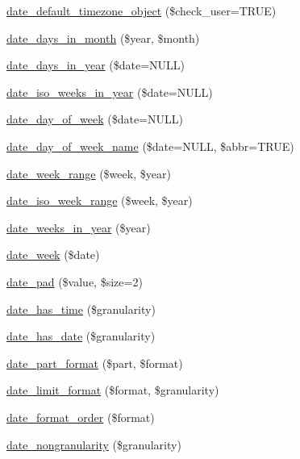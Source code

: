 \begin{DoxyCompactItemize}
\item 
\hyperlink{date__api_8module_ab642766b1f0a98ed0c91e765e8e2085b}{date\_\-default\_\-timezone\_\-object} (\$check\_\-user=TRUE)
\item 
\hyperlink{date__api_8module_ab98127065d91ca887cbae1675622ca90}{date\_\-days\_\-in\_\-month} (\$year, \$month)
\item 
\hyperlink{date__api_8module_a37d190c0e72a50d069ba56ef8004730b}{date\_\-days\_\-in\_\-year} (\$date=NULL)
\item 
\hyperlink{date__api_8module_a87b3a294949c7309f5cfd29f39358015}{date\_\-iso\_\-weeks\_\-in\_\-year} (\$date=NULL)
\item 
\hyperlink{date__api_8module_aeba2cb02e4bee3560f69941fa4b2337a}{date\_\-day\_\-of\_\-week} (\$date=NULL)
\item 
\hyperlink{date__api_8module_a4d08b5abdf43cc6db86eb8ea3dfdbcba}{date\_\-day\_\-of\_\-week\_\-name} (\$date=NULL, \$abbr=TRUE)
\item 
\hyperlink{date__api_8module_a2616fe3c5af3b92fecfbc2c6240cf804}{date\_\-week\_\-range} (\$week, \$year)
\item 
\hyperlink{date__api_8module_a4219d571258d7d10f9874c7107a78c20}{date\_\-iso\_\-week\_\-range} (\$week, \$year)
\item 
\hyperlink{date__api_8module_a44b370ef2cba956130ea77bccb231ac5}{date\_\-weeks\_\-in\_\-year} (\$year)
\item 
\hyperlink{date__api_8module_aad517bbfed52d465074d1a880050f683}{date\_\-week} (\$date)
\item 
\hyperlink{date__api_8module_af51cb5e8020a77ecaa2925b3246c1576}{date\_\-pad} (\$value, \$size=2)
\item 
\hyperlink{date__api_8module_a86cfd92e64a544b228e916cd1b192c59}{date\_\-has\_\-time} (\$granularity)
\item 
\hyperlink{date__api_8module_adceab3322ab2c3d4375db8c974da9d7a}{date\_\-has\_\-date} (\$granularity)
\item 
\hyperlink{date__api_8module_abc007385b75d357bc72847b8aec3516e}{date\_\-part\_\-format} (\$part, \$format)
\item 
\hyperlink{date__api_8module_a9a2ae59466da6a43b3ff481b081f7096}{date\_\-limit\_\-format} (\$format, \$granularity)
\item 
\hyperlink{date__api_8module_afe15ee89e22483e9231870a55e689cbd}{date\_\-format\_\-order} (\$format)
\item 
\hyperlink{date__api_8module_a3ab0befc8508e23ad18062b5a6f8b84b}{date\_\-nongranularity} (\$granularity)

\end{DoxyCompactItemize}
